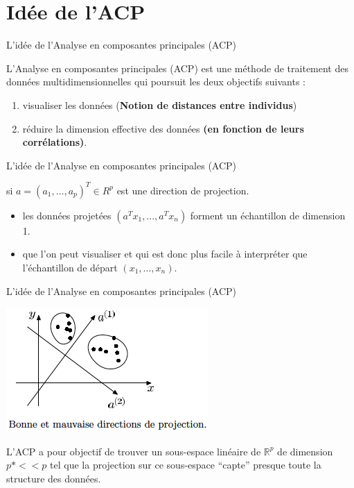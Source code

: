 \documentclass[12pt]{beamer}
\begin{document}

\section{Idée de l'ACP}
\begin{frame}{L’idée de l’Analyse en composantes principales (ACP)}

L’Analyse en composantes principales (ACP) est une méthode de traitement des données multidimensionnelles qui poursuit les deux objectifs suivants :

\begin{enumerate}
\item visualiser les données (\textbf{Notion de distances entre individus})
\item réduire la dimension effective des données \textbf{(en fonction de leurs corrélations)}.
\end{enumerate}



\end{frame}



\begin{frame}{L’idée de l’Analyse en composantes principales (ACP)}


si $a = (a_1, \ldots ,a_p)^T \in R^p$ est une direction de projection.\\

\begin{itemize}
\item les données projetées
$(a^T x_1, . . . ,a^T x_n)$ forment un échantillon de dimension 1.
\item que l’on peut visualiser et qui est donc plus facile à interpréter que l’échantillon de départ $(x_1, \dots , x_n)$.\\

\end{itemize}


\end{frame}

\begin{frame}{L’idée de l’Analyse en composantes principales (ACP)}

\centering

\includegraphics[scale=0.6]{ACP_ID.png} 

L’ACP a pour objectif de trouver un sous-espace linéaire de $\mathbb{R}^p$ de dimension $p* << p$ tel que la projection sur ce sous-espace “capte” presque toute la structure des données.


\end{frame}
\end{document}
